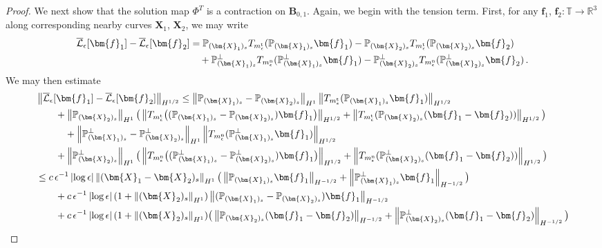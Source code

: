 \documentclass[11pt,reqno]{amsart}
\newcommand{\R}{\mathbb{R}}
\newcommand{\T}{\mathbb{T}}
\renewcommand{\P}{\mathbb{P}}
\newcommand{\X}{\bm{X}}
\newcommand{\abs}[1]{\left\lvert #1 \right\rvert}
\newcommand{\norm}[1]{\left\lVert #1 \right\rVert}
\newcommand{\mc}[1]{\mathcal{#1}}
\numberwithin{equation}{section}
\theoremstyle{definition}
\begin{document}
\begin{proof}
We next show that the solution map $\Phi^T$ is a contraction on $\bm{B}_{0,1}$. Again, we begin with the tension term. 
%
First, for any $\bm{f}_1$, $\bm{f}_2:\T\to \R^3$ along corresponding nearby curves $\X_1$, $\X_2$, we may write
\begin{equation}
\begin{aligned}
  \overline{\mc{L}}_\epsilon[\bm{f}_1]-\overline{\mc{L}}_\epsilon[\bm{f}_2] &=  \P_{(\X_1)_s}T_{m_\epsilon^{\rm t}}(\P_{(\X_1)_s}\bm{f}_1) - \P_{(\X_2)_s}T_{m_\epsilon^{\rm t}}(\P_{(\X_2)_s}\bm{f}_2)\\
  &\quad + \P_{(\X_1)_s}^\perp T_{m_\epsilon^{\rm n}}(\P_{(\X_1)_s}^\perp \bm{f}_1) - \P_{(\X_2)_s}^\perp T_{m_\epsilon^{\rm n}}(\P_{(\X_2)_s}^\perp \bm{f}_2)\,.
\end{aligned}
\end{equation}
%
%
We may then estimate
\begin{equation}
\begin{aligned}
  &\norm{\overline{\mc{L}}_\epsilon[\bm{f}_1]-\overline{\mc{L}}_\epsilon[\bm{f}_2]}_{H^{1/2}} \le  
  \norm{\P_{(\X_1)_s}- \P_{(\X_2)_s}}_{H^1}\norm{T_{m_\epsilon^{\rm t}}(\P_{(\X_1)_s}\bm{f}_1)}_{H^{1/2}} \\
  &\qquad +
  \norm{\P_{(\X_2)_s}}_{H^1}\big(\norm{T_{m_\epsilon^{\rm t}}\big((\P_{(\X_1)_s}-\P_{(\X_2)_s})\bm{f}_1\big)}_{H^{1/2}}+
  \norm{T_{m_\epsilon^{\rm t}}(\P_{(\X_2)_s}(\bm{f}_1-\bm{f}_2))}_{H^{1/2}}\big)\\
  &\quad\qquad  + \norm{\P_{(\X_1)_s}^\perp- \P_{(\X_2)_s}^\perp}_{H^1}\norm{T_{m_\epsilon^{\rm n}}(\P_{(\X_1)_s}^\perp\bm{f}_1)}_{H^{1/2}} \\
  &\qquad +
  \norm{\P_{(\X_2)_s}^\perp}_{H^1}\big(\norm{T_{m_\epsilon^{\rm n}}\big((\P_{(\X_1)_s}^\perp-\P_{(\X_2)_s}^\perp)\bm{f}_1\big)}_{H^{1/2}}+
  \norm{T_{m_\epsilon^{\rm n}}(\P_{(\X_2)_s}^\perp(\bm{f}_1-\bm{f}_2))}_{H^{1/2}}\big)\\
  &\le c\,\epsilon^{-1}\abs{\log\epsilon}\norm{(\X_1-\X_2)_s}_{H^1}\big(\norm{\P_{(\X_1)_s}\bm{f}_1}_{H^{-1/2}}+\norm{\P_{(\X_1)_s}^\perp\bm{f}_1}_{H^{-1/2}}\big)\\
  &\qquad + c\,\epsilon^{-1}\abs{\log\epsilon}(1+\norm{(\X_2)_s}_{H^1}) \norm{(\P_{(\X_1)_s}-\P_{(\X_2)_s})\bm{f}_1}_{H^{-1/2}}  \\
  &\qquad + c\,\epsilon^{-1}\abs{\log\epsilon}(1+\norm{(\X_2)_s}_{H^1})\big( \norm{\P_{(\X_2)_s}(\bm{f}_1-\bm{f}_2)}_{H^{-1/2}} + \norm{\P_{(\X_2)_s}^\perp(\bm{f}_1-\bm{f}_2)}_{H^{-1/2}}\big)\\

\end{aligned}
\end{equation}
\end{proof}
\end{document}
